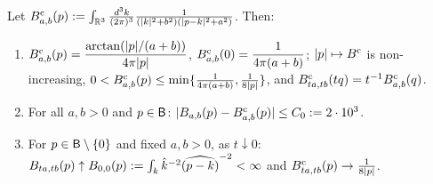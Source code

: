 \begin{lemma}\label{lem:a05:bub}
Let $B^{\mathrm c}_{a,b}(p):=\int_{\mathbb R^3}\frac{d^3k}{(2\pi)^3}\frac1{(|k|^2+b^2)(|p-k|^2+a^2)}$. Then:
\begin{enumerate}[label=\textup{(\roman*)},nosep,leftmargin=*]
\item $B^{\mathrm c}_{a,b}(p)=\dfrac{\arctan(|p|/(a+b))}{4\pi|p|}$, $B^{\mathrm c}_{a,b}(0)=\dfrac1{4\pi(a+b)}$; $|p|\mapsto B^{\mathrm c}$ is non-increasing, $0<B^{\mathrm c}_{a,b}(p)\le\min\{\frac1{4\pi(a+b)},\frac1{8|p|}\}$, and $B^{\mathrm c}_{ta,tb}(tq)=t^{-1}B^{\mathrm c}_{a,b}(q)$.
\item For all $a,b>0$ and $p\in\mathsf B$: $|B_{a,b}(p)-B^{\mathrm c}_{a,b}(p)|\le C_0:=2\cdot10^3$.
\item For $p\in\mathsf B\setminus\{0\}$ and fixed $a,b>0$, as $t\downarrow0$: $B_{ta,tb}(p)\uparrow B_{0,0}(p):=\int_{k}\hat k^{-2}\widehat{(p-k)}^{-2}<\infty$ and $B^{\mathrm c}_{ta,tb}(p)\to\frac1{8|p|}$.
\end{enumerate}
\end{lemma}
